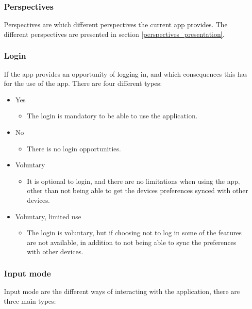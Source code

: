 \subsubsection{Perspectives}
Perspectives are which different perspectives the current app provides. The different perspectives are presented in section \ref{perspectives_presentation}.

\subsubsection{Login}
If the app provides an opportunity of logging in, and which consequences this has for the use of the app. There are four different types:

\begin{itemize}
	\item Yes
	\begin{itemize}
		\item The login is mandatory to be able to use the application.
	\end{itemize}

	\item No
	\begin{itemize}
		\item There is no login opportunities.
	\end{itemize}

	\item Voluntary
	\begin{itemize}
		\item It is optional to login, and there are no limitations when using the app, other than not being able to get the devices preferences synced with other devices.
	\end{itemize}

	\item Voluntary, limited use
	\begin{itemize}
		\item The login is voluntary, but if choosing not to log in some of the features are not available, in addition to not being able to sync the preferences with other devices.
	\end{itemize}
\end{itemize}


\subsubsection{Input mode}
Input mode are the different ways of interacting with the application, there are three main types:

